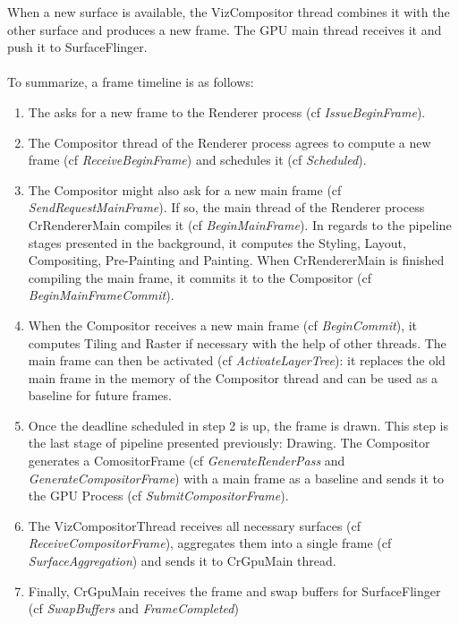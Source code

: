     \iffalse
    When a new surface is available, the VizCompositor thread combines it with the other surface and produces a new frame. The GPU main thread receives it and push it to SurfaceFlinger.
\paragraph{}
To summarize, a frame timeline is as follows:
\begin{enumerate}
    \item The  asks for a new frame to the Renderer process (cf \textit{IssueBeginFrame}).
    \item The Compositor thread of the Renderer process agrees to compute a new frame (cf \textit{ReceiveBeginFrame}) and schedules it (cf \textit{Scheduled}).
    \item The Compositor might also ask for a new main frame (cf \textit{SendRequestMainFrame}). If so, the main thread of the Renderer process CrRendererMain compiles it (cf \textit{BeginMainFrame}). In regards to the pipeline stages presented in the background, it computes the Styling, Layout, Compositing, Pre-Painting and Painting. When CrRendererMain is finished compiling the main frame, it commits it to the Compositor (cf \textit{BeginMainFrameCommit}).
    \item When the Compositor receives a new main frame (cf \textit{BeginCommit}), it computes Tiling and Raster if necessary with the help of other threads. The main frame can then be activated (cf \textit{ActivateLayerTree}): it replaces the old main frame in the memory of the Compositor thread and can be used as a baseline for future frames.
    \item Once the deadline scheduled in step 2 is up, the frame is drawn. This step is the last stage of pipeline presented previously: Drawing. The Compositor generates a ComositorFrame (cf \textit{GenerateRenderPass} and \textit{GenerateCompositorFrame}) with a main frame as a baseline and sends it to the GPU Process (cf \textit{SubmitCompositorFrame}).
    \item The VizCompositorThread receives all necessary surfaces (cf \textit{ReceiveCompositorFrame}), aggregates them into a single frame (cf \textit{SurfaceAggregation}) and sends it to CrGpuMain thread.
    \item Finally, CrGpuMain receives the frame and swap buffers for SurfaceFlinger (cf \textit{SwapBuffers} and \textit{FrameCompleted})
\end{enumerate}


